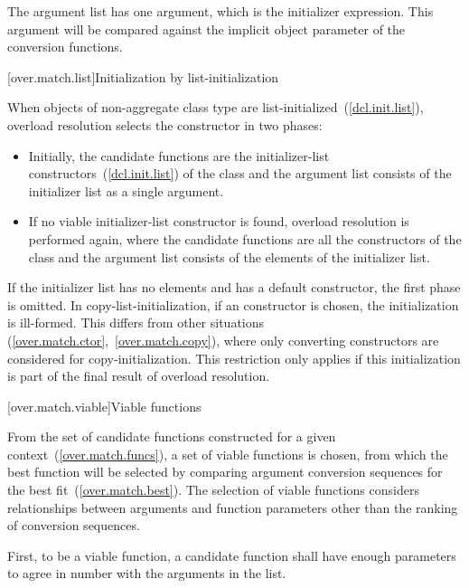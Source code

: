 \pnum
The argument list has one argument, which is the initializer expression.
\enternote
This argument will be compared against
the implicit object parameter of the conversion functions.
\exitnote

[over.match.list]{Initialization by list-initialization}%

\pnum
When objects of non-aggregate class type  are
list-initialized~(\ref{dcl.init.list}), overload resolution selects the
constructor in two phases:

\begin{itemize}
\item
Initially, the candidate functions are the initializer-list constructors~(\ref{dcl.init.list})
of the class  and
the argument list consists of the initializer list as a single argument.

\item
If no viable initializer-list constructor is found, overload resolution is
performed again, where the candidate functions are all the constructors of
the class  and
the argument list consists of the elements of the initializer list.
\end{itemize}%
%

If the initializer list has no elements and  has a default constructor,
the first phase is omitted.
In copy-list-initialization, if an  constructor is
chosen, the initialization is ill-formed. \enternote
This differs from other situations (\ref{over.match.ctor},~\ref{over.match.copy}),
where only converting constructors are considered for copy-initialization.
This restriction only
applies if this initialization is part of the final result of overload
resolution. \exitnote

[over.match.viable]{Viable functions}%

\pnum
From the set of candidate functions constructed for a given
context~(\ref{over.match.funcs}), a set of viable functions is
chosen, from which the best function will be selected by
comparing argument conversion sequences for the best fit~(\ref{over.match.best}).
The selection of viable functions considers
relationships between arguments and function parameters other
than the ranking of conversion sequences.

\pnum
{}%
%
First, to be a viable function, a candidate function shall have
enough parameters to agree in number with the arguments in the
list.


